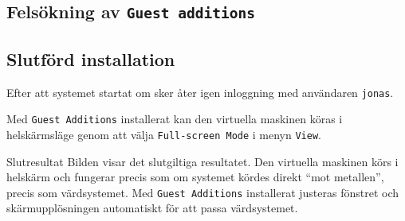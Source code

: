 \subsection{Felsökning av \texttt{Guest additions}}

           {}
           {}
           {}

           {}
           {}
           {}

           {}
           {}
           {}

           {}
           {}
           {}

           {}
           {}
           {}

           {}
           {}
           {}

           {}
           {}
           {}

           {}
           {}
           {}

           {}
           {}
           {}

           {}
           {}
           {}


\subsection{Slutförd installation}

           {}
           {Efter att systemet startat om sker åter igen inloggning med
            användaren \texttt{jonas}.}
           {}

           {}
           {Med \texttt{Guest Additions} installerat kan den virtuella maskinen
            köras i helskärmsläge genom att välja \texttt{Full-screen Mode} i
            menyn \texttt{View}.}
           {}

           {Slutresultat}
           {Bilden visar det slutgiltiga resultatet. Den virtuella maskinen
            körs i helskärm och fungerar precis som om systemet kördes direkt
            ``mot metallen'', precis som värdsystemet.
            Med \texttt{Guest Additions} installerat justeras fönstret och
            skärmupplösningen automatiskt för att passa värdsystemet.}
           {}

